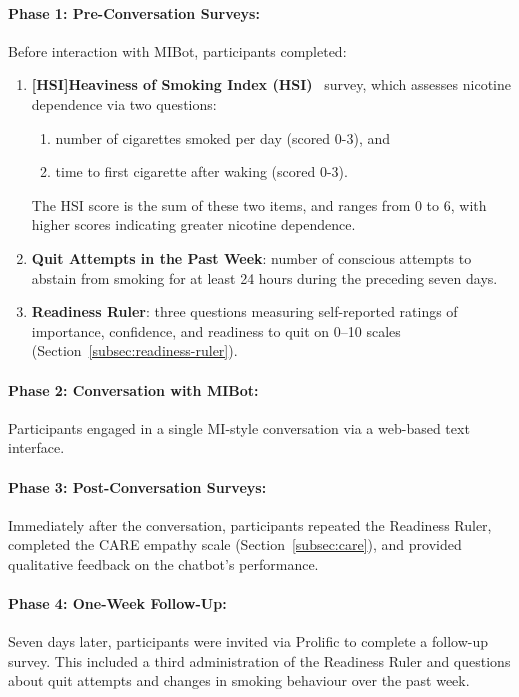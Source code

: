 \paragraph{Phase 1: Pre-Conversation Surveys:}
Before interaction with MIBot, participants completed:
\begin{enumerate}
    \item \textbf{[HSI]Heaviness of Smoking Index (HSI)}~\citep{heatherton1989measuring} survey, which assesses nicotine dependence via two questions:
        \begin{enumerate}
            \item number of cigarettes smoked per day (scored 0-3), and
            \item time to first cigarette after waking (scored 0-3).
        \end{enumerate}
    The HSI score is the sum of these two items, and ranges from 0 to 6, with higher scores indicating greater nicotine dependence.
    \item \textbf{Quit Attempts in the Past Week}: number of conscious attempts to abstain from smoking for at least 24 hours during the preceding seven days.
    \item \textbf{Readiness Ruler}: three questions measuring self-reported ratings of importance, confidence, and readiness to quit on 0–10 scales (Section~\ref{subsec:readiness-ruler}).
\end{enumerate}

\paragraph{Phase 2: Conversation with MIBot:}
Participants engaged in a single MI-style conversation via a web-based text interface.

\paragraph{Phase 3: Post-Conversation Surveys:}
Immediately after the conversation, participants repeated the Readiness Ruler, completed the CARE empathy scale (Section~\ref{subsec:care}), and provided qualitative feedback on the chatbot's performance.

\paragraph{Phase 4: One-Week Follow-Up:}
Seven days later, participants were invited via Prolific to complete a follow-up survey. This included a third administration of the Readiness Ruler and questions about quit attempts and changes in smoking behaviour over the past week.

